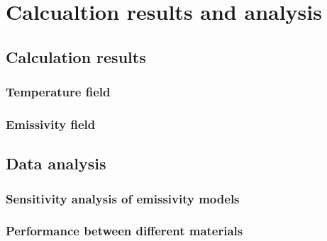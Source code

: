 \chapter{Calcualtion results and analysis}

\section{Calculation results}

\subsection{Temperature field}

\subsection{Emissivity field}

\section{Data analysis}

\subsection{Sensitivity analysis of emissivity models}

\subsection{Performance between different materials}